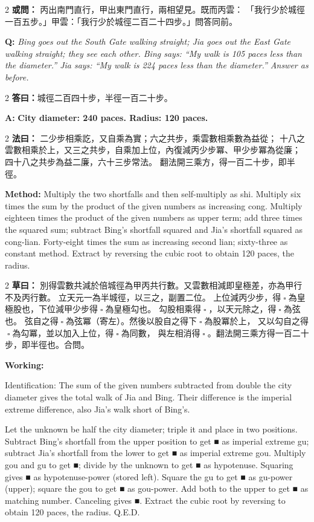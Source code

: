 \documentclass[11pt,a4paper]{article}
\let\origsquare\square
\renewcommand{\square}{\ensuremath{\origsquare}}%
\newcommand{\owen}[1]{%
  \noindent\textcolor{problemcolor}{\textbf{或問：}}{\tradfont #1}\par\nopagebreak%
}
\newcommand{\oweneng}[1]{%
  \noindent\textcolor{engcolor}{\textbf{Q: }}{\itshape #1}\par\nopagebreak%
}
\newcommand{\fayue}[1]{%
  \noindent\textcolor{methodcolor}{\textbf{法曰：}}{\tradfont #1}\par\nopagebreak%
}
\newcommand{\fayueeng}[1]{%
  \noindent\textcolor{engcolor}{\textbf{Method: }}{#1}\par\nopagebreak%
}
\newcommand{\tsaoyue}[1]{%
  \noindent\textcolor{workcolor}{\textbf{草曰：}}{\tradfont #1}\par%
}
\newcommand{\tsaoyueeng}[1]{%
  \noindent\textcolor{engcolor}{\textbf{Working: }}{\small #1}\par%
}
\newcommand{\dayue}[1]{%
  \noindent\textcolor{anscolor}{\textbf{答曰：}}{\tradfont #1}\par\nopagebreak%
}
\newcommand{\dayueeng}[1]{%
  \noindent\textcolor{engcolor}{\textbf{A: }}{\bfseries #1}\par\nopagebreak%
}
\begin{document}
\begin{paracol}{2}
\owen{%
丙出南門直行，甲出東門直行，兩相望見。既而丙雲：
「我行少於城徑一百五步。」甲雲：「我行少於城徑二百二十四步。」問答同前。}
\switchcolumn
\oweneng{%
Bing goes out the South Gate walking straight; Jia goes out the East Gate walking straight; they see each other. Bing says: ``My walk is 105 paces less than the diameter.'' Jia says: ``My walk is 224 paces less than the diameter.'' Answer as before.}
\end{paracol}

\begin{paracol}{2}
\dayue{城徑二百四十步，半徑一百二十步。}
\switchcolumn
\dayueeng{City diameter: 240 paces. Radius: 120 paces.}
\end{paracol}

\begin{paracol}{2}
\fayue{%
二少步相乘訖，又自乘為實；六之共步，乘雲數相乘數為益從；
十八之雲數相乘於上，又三之共步，自乘加上位，內復減丙少步冪、甲少步冪為從廉；
四十八之共步為益二廉，六十三步常法。
翻法開三乘方，得一百二十步，即半徑。}
\switchcolumn
\fayueeng{%
Multiply the two shortfalls and then self-multiply as shi. Multiply six times the sum by the product of the given numbers as increasing cong. Multiply eighteen times the product of the given numbers as upper term; add three times the squared sum; subtract Bing's shortfall squared and Jia's shortfall squared as cong-lian. Forty-eight times the sum as increasing second lian; sixty-three as constant method. Extract by reversing the cubic root to obtain 120 paces, the radius.}
\end{paracol}

\begin{paracol}{2}
\tsaoyue{%
別得雲數共減於倍城徑為甲丙共行數。又雲數相減即皇極差，亦為甲行不及丙行數。
立天元一為半城徑，以三之，副置二位。
上位減丙少步，得$ \; \square \; $為皇極股也，下位減甲少步得$ \; \square \; $為皇極勾也。
勾股相乘得$ \; \square \; $，以天元除之，得$ \; \square \; $為弦也。
弦自之得$ \; \square \; $為弦冪（寄左）。然後以股自之得下$ \; \square \; $為股冪於上，
又以勾自之得$ \; \square \; $為勾冪，並以加入上位，得$ \; \square \; $為同數，
與左相消得$ \; \square \; $。翻法開三乘方得一百二十步，即半徑也。合問。}
\switchcolumn
\tsaoyueeng{%
Identification: The sum of the given numbers subtracted from double the city diameter gives the total walk of Jia and Bing. Their difference is the imperial extreme difference, also Jia's walk short of Bing's.

Let the unknown be half the city diameter; triple it and place in two positions. Subtract Bing's shortfall from the upper position to get ■ as imperial extreme gu; subtract Jia's shortfall from the lower to get ■ as imperial extreme gou. Multiply gou and gu to get ■; divide by the unknown to get ■ as hypotenuse. Squaring gives ■ as hypotenuse-power (stored left). Square the gu to get ■ as gu-power (upper); square the gou to get ■ as gou-power. Add both to the upper to get ■ as matching number. Canceling gives ■. Extract the cubic root by reversing to obtain 120 paces, the radius. Q.E.D.}
\end{paracol}
\end{document}
